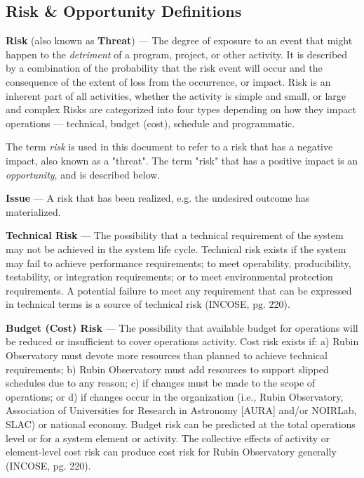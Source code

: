\subsection{Risk \& Opportunity Definitions}
\label{sec:definitions}

\textbf{Risk} (also known as \textbf{Threat}) ---
 The degree of exposure to an event that might happen to the \emph{detriment}  of a program, project, or other activity. 
 It is described by a combination of the probability that the risk event will occur and the consequence of the extent of loss from the occurrence, or impact.
 Risk is an inherent part of all activities, whether the activity is simple and small, or large and complex
Risks are categorized into four types depending on how they impact operations --- technical, budget (cost), schedule and programmatic.

The term \emph{risk} is used in this document to refer to a risk that has a negative impact, also known as a "threat". 
The term "risk" that has a positive impact is an \emph{opportunity}, and is described below.

\textbf{Issue} ---
A risk that has been realized, e.g. the undesired outcome has materialized.

\textbf{Technical Risk} ---
The possibility that a technical requirement of the system may not be achieved in the system life cycle.
Technical risk exists if the system may fail to achieve performance requirements; to meet operability, producibility, testability, or integration requirements; or to meet environmental protection requirements.
A potential failure to meet any requirement that can be expressed in technical terms is a source of technical risk (INCOSE, pg. 220).

\textbf{Budget (Cost) Risk} ---
The possibility that available budget for operations will be reduced or insufficient to cover operations activity.
Cost risk exists if: a) Rubin Observatory must devote more resources than planned to achieve technical requirements; b) Rubin Observatory must add resources to support slipped schedules due to any reason; c) if changes must be made to the scope of operations; or d) if changes occur in the organization (i.e., Rubin Observatory, Association of Universities for Research in Astronomy [AURA] and/or NOIRLab, SLAC) or national economy.
Budget risk can be predicted at the total operations level or for a system element or activity.
The collective effects of activity or element-level cost risk can produce cost risk for Rubin Observatory generally (INCOSE, pg. 220).

